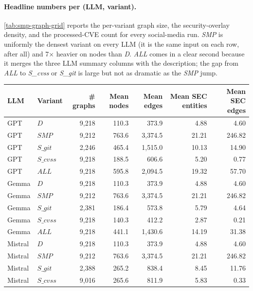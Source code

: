 \documentclass[11pt,a4paper]{article}
\begin{document}
\paragraph{Headline numbers per (LLM, variant).}
\autoref{tab:smp-graph-grid} reports the per-variant
graph size, the security-overlay density, and the
processed-CVE count for every social-media run. \emph{SMP}
is uniformly the densest variant on every LLM (it is the
same input on each row, after all) and 7$\times$ heavier
on nodes than \emph{D}. \emph{ALL} comes in a clear second
because it merges the three LLM summary columns with the
description; the gap from \emph{ALL} to \emph{S\_cvss} or
\emph{S\_git} is large but not as dramatic as the
\emph{SMP} jump.

\begin{table}[!htbp]
\centering\footnotesize
\setlength{\tabcolsep}{5pt}
\begin{tabular}{l l r r r r r}
\toprule
LLM & Variant & \# graphs & Mean nodes & Mean edges & Mean SEC entities & Mean SEC edges \\
\midrule
GPT     & $D$       & 9{,}218 &  110.3 &   373.9 &  4.88 &   4.60 \\
GPT     & $SMP$     & 9{,}212 &  763.6 & 3{,}374.5 & 21.21 & 246.82 \\
GPT     & $S\_git$  & 2{,}246 &  465.4 & 1{,}515.0 & 10.13 &  14.90 \\
GPT     & $S\_cvss$ & 9{,}218 &  188.5 &   606.6 &  5.20 &   0.77 \\
GPT     & $ALL$     & 9{,}218 &  595.8 & 2{,}094.5 & 19.32 &  57.70 \\
\midrule
Gemma   & $D$       & 9{,}218 &  110.3 &   373.9 &  4.88 &   4.60 \\
Gemma   & $SMP$     & 9{,}212 &  763.6 & 3{,}374.5 & 21.21 & 246.82 \\
Gemma   & $S\_git$  & 2{,}381 &  186.4 &   573.8 &  5.79 &   4.64 \\
Gemma   & $S\_cvss$ & 9{,}218 &  140.3 &   412.2 &  2.87 &   0.21 \\
Gemma   & $ALL$     & 9{,}218 &  441.1 & 1{,}430.6 & 14.19 &  31.38 \\
\midrule
Mistral & $D$       & 9{,}218 &  110.3 &   373.9 &  4.88 &   4.60 \\
Mistral & $SMP$     & 9{,}212 &  763.6 & 3{,}374.5 & 21.21 & 246.82 \\
Mistral & $S\_git$  & 2{,}388 &  265.2 &   838.4 &  8.45 &  11.76 \\
Mistral & $S\_cvss$ & 9{,}016 &  265.6 &   811.9 &  5.83 &   0.33 \\

\end{tabular}
\end{table}
\end{document}
